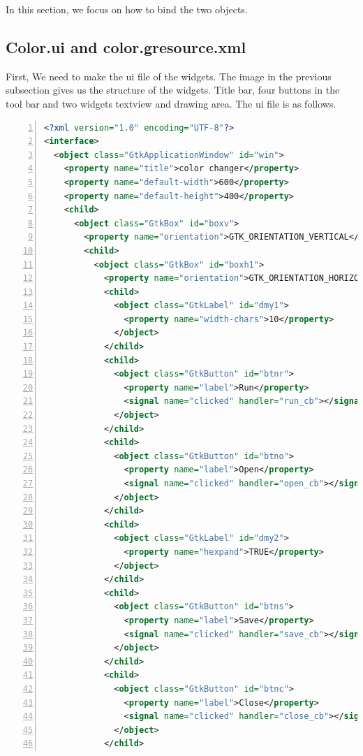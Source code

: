 In this section, we focus on how to bind the two objects.

\hypertarget{color.ui-and-color.gresource.xml}{%
\subsection{Color.ui and
color.gresource.xml}\label{color.ui-and-color.gresource.xml}}

First, We need to make the ui file of the widgets. The image in the
previous subsection gives us the structure of the widgets. Title bar,
four buttons in the tool bar and two widgets textview and drawing area.
The ui file is as follows.

\begin{lstlisting}[language=XML, numbers=left]
<?xml version="1.0" encoding="UTF-8"?>
<interface>
  <object class="GtkApplicationWindow" id="win">
    <property name="title">color changer</property>
    <property name="default-width">600</property>
    <property name="default-height">400</property>
    <child>
      <object class="GtkBox" id="boxv">
        <property name="orientation">GTK_ORIENTATION_VERTICAL</property>
        <child>
          <object class="GtkBox" id="boxh1">
            <property name="orientation">GTK_ORIENTATION_HORIZONTAL</property>
            <child>
              <object class="GtkLabel" id="dmy1">
                <property name="width-chars">10</property>
              </object>
            </child>
            <child>
              <object class="GtkButton" id="btnr">
                <property name="label">Run</property>
                <signal name="clicked" handler="run_cb"></signal>
              </object>
            </child>
            <child>
              <object class="GtkButton" id="btno">
                <property name="label">Open</property>
                <signal name="clicked" handler="open_cb"></signal>
              </object>
            </child>
            <child>
              <object class="GtkLabel" id="dmy2">
                <property name="hexpand">TRUE</property>
              </object>
            </child>
            <child>
              <object class="GtkButton" id="btns">
                <property name="label">Save</property>
                <signal name="clicked" handler="save_cb"></signal>
              </object>
            </child>
            <child>
              <object class="GtkButton" id="btnc">
                <property name="label">Close</property>
                <signal name="clicked" handler="close_cb"></signal>
              </object>
            </child>

\end{lstlisting}
